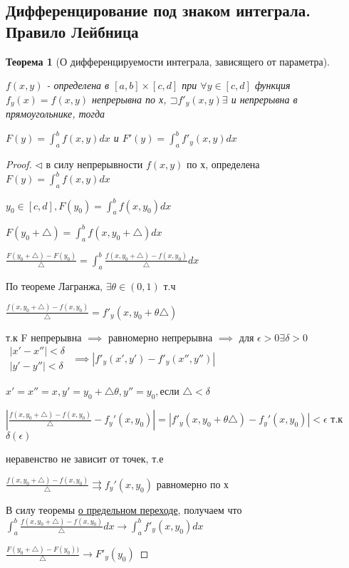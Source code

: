 \documentclass[a4paper]{article}
\newcommand\letsymbol{\mathord{\sqsupset}}
\newtheorem{theorem}{Теорема}[section]
\theoremstyle{definition}
\theoremstyle{remark}
\begin{document}
    \subsection{	Дифференцирование под знаком интеграла. Правило Лейбница}
    \begin{theorem}[О дифференцируемости интеграла, зависящего от параметра]\hypertarget{theorem4}{}
     $f(x,y)$ - определена в $[a, b]\times[c, d]$ при $\forall y \in [c, d]$
     функция $f_y(x) = f(x, y)$ непрерывна по х, $\letsymbol{} f'_y(x,y)\exists$
     и непрерывна в прямоугольнике, тогда

     $F(y) = \int_{a}^{b}f(x,y)dx$ и $F'(y) = \int_{a}^{b}f'_y(x,y)dx$
\end{theorem}
\begin{proof}
$\triangleleft$ в силу непрерывности $f(x,y)$ по х, определена $F(y) = \int_{a}^{b}f(x,y)dx$

$y_0 \in [c,d], F(y_0) = \int_{a}^{b}f(x,y_0)dx$

$F(y_0+\triangle) = \int_{a}^{b}f(x,y_0 + \triangle)dx$

$\frac{F(y_0+\triangle) - F(y_0)}{\triangle} = \int_{a}^{b}\frac{f(x,y_0+\triangle) - f(x,y_0)}{\triangle}dx$

По теореме Лагранжа, $\exists \theta \in (0, 1)$ т.ч 

$\frac{f(x,y_0+\triangle) - f(x, y_0)}{\triangle} = f'_y(x, y_0+\theta\triangle)$

т.к F непрерывна $\implies$ равномерно непрерывна  $\implies$
для $\epsilon>0 \exists \delta>0$
$\begin{array}{l}
|x' - x''|< \delta\\
|y' - y''|<\delta
\end{array}
$
$\implies |f'_y(x', y') - f'_y(x'', y'')|$


$x' = x'' = x, y' = y_0 + \triangle\theta, y'' = y_0,$если $\triangle<\delta$

$|\frac{f(x,y_0+\triangle) - f(x, y_0)}{\triangle} - f_y'(x,y_0)| = |f'_y(x, y_0+\theta\triangle) - f_y'(x,y_0)|<\epsilon$ т.к $\delta(\epsilon)$

неравенство не зависит от точек, т.е

$\frac{f(x,y_0+\triangle) - f(x, y_0)}{\triangle}\rightrightarrows f_y'(x,y_0)$ равномерно по х

В силу теоремы \hyperlink{p2}{о предельном переходе}, получаем что $\int_a^b \frac{f(x,y_0+\triangle) - f(x, y_0)}{\triangle}dx \rightarrow \int_a^b f'_y(x, y_0)dx$

$\frac{F(y_0+\triangle) - F(y_0))}{\triangle} \rightarrow F'_y(y_0)$
\end{proof}
\end{document}
